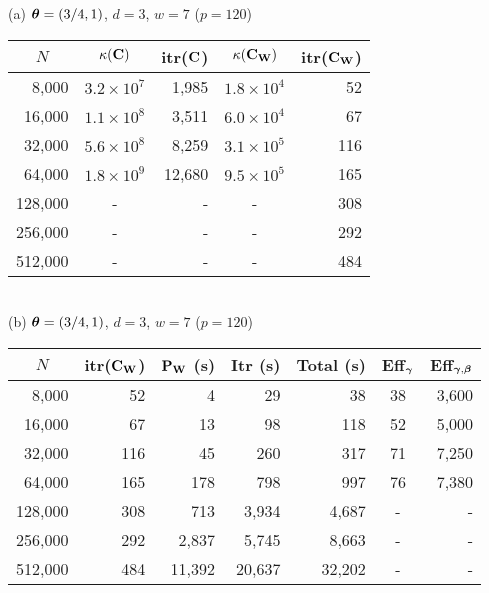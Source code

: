 \documentclass[11pt,final]{amsart}       %
\begin{document}
\begin{table*}[htbp]
{  %
}
\begin{center}
  \bigskip
  (a) $\boldsymbol{\theta} = (3/4,1)$, $d = 3$, $w = 7$ ($p = 120$) \\
  \bigskip
\begin{tabular} { r c r c r}
  \multicolumn{1}{c}{$N$} &
  \multicolumn{1}{c}{$\kappa(\mathbf{C})$} &
    \multicolumn{1}{c}{itr($\mathbf{C}$)} &
  \multicolumn{1}{c}{$\kappa(\mathbf{C}_{\mathbf{W}})$} &
  itr($\mathbf{C}_{\mathbf{W}}$) \\
  \hline
  8,000  & $3.2 \times 10^{7}$   &    1,985 & $1.8 \times 10^{4}$ &   52  \\  
  16,000  & $1.1 \times 10^{8}$  &    3,511 & $6.0 \times 10^{4}$ &   67  \\  
  32,000  & $5.6 \times 10^{8}$  &    8,259 & $3.1 \times 10^{5}$ &  116  \\  
  64,000  &  $1.8 \times 10^{9}$ &   12,680 & $9.5 \times 10^{5}$  & 165  \\  
  128,000 &                 -   &      -  &                  -  &  308   \\  
  256,000 &                 -   &      -  &                  -  &  292   \\  
  512,000 &                 -   &      -  &                  -  &  484   \\  
\end{tabular}
\\
\bigskip
(b) $\boldsymbol{\theta} = (3/4,1)$, $d = 3$, $w = 7$ ($p = 120$) \\
\bigskip
\begin{tabular} { r r r r r c r}    
  \multicolumn{1}{c}{$N$} 
  & itr($\mathbf{C}_{\mathbf{W}}$) & $\mathbf{P}_{\mathbf{W}}$ (s) & Itr (s) & Total (s) & Eff$_{\boldsymbol{\gamma}}$ &
  \multicolumn{1}{c}{Eff$_{\boldsymbol{\gamma},\boldsymbol{\beta}}$} \\
  \hline
  8,000   &   52  &       4   &      29  &     38 &  38 &   3,600  \\
  16,000  &   67  &      13   &      98  &    118 &  52 &   5,000  \\
  32,000  &  116  &      45   &     260  &    317 &  71 &   7,250  \\
  64,000  &  165  &     178   &     798  &    997 &  76 &   7,380  \\
  128,000 &  308  &     713   &   3,934  &  4,687 &   - &    - \\
  256,000 &  292  &   2,837   &   5,745  &  8,663 &   - &    - \\
  512,000 &  484  &   11,392  &  20,637  & 32,202 &   - &    - \\

\end{tabular}
\end{center}
\end{table*}
\end{document}
